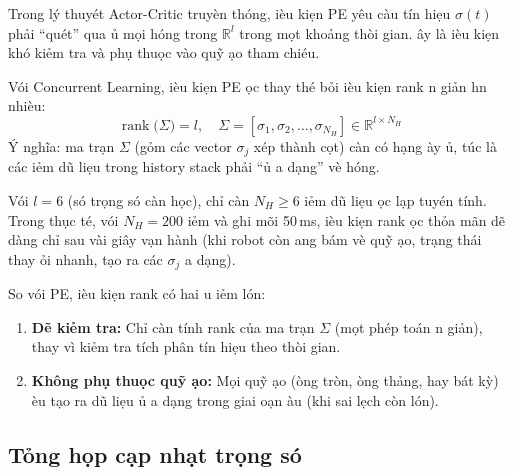\documentclass[12pt,a4paper]{article}
\newcommand{\R}{\mathbb{R}}
\DeclareMathOperator{\rank}{rank}
\begin{document}
Trong l\'{y} thuy\'{e}t Actor-Critic truy\`{e}n th\'{o}ng, \dj i\`{e}u ki\d{e}n PE y\^{e}u c\`{a}u t\'{i}n hi\d{e}u $\sigma(t)$ ph\h{a}i ``qu\'{e}t'' qua \dj\h{u} m\d{o}i h\uhorn{}\'{o}ng trong $\R^l$ trong m\d{o}t kho\h{a}ng th\`{o}i gian. \DJ\^{a}y l\`{a} \dj i\`{e}u ki\d{e}n kh\'{o} ki\h{e}m tra v\`{a} ph\d{u} thu\d{o}c v\`{a}o qu\~{y} \dj\d{a}o tham chi\'{e}u.

V\'{o}i Concurrent Learning, \dj i\`{e}u ki\d{e}n PE \dj\uhorn{}\d{o}c thay th\'{e} b\h{o}i \dj i\`{e}u ki\d{e}n rank \dj\ohorn{}n gi\h{a}n h\ohorn{}n nhi\`{e}u:
\begin{equation}\label{eq:rank_cond}
    \rank\big(\Sigma\big) = l, \quad \Sigma = [\sigma_1, \sigma_2, \ldots, \sigma_{N_H}] \in \R^{l \times N_H}
\end{equation}
\'{Y} ngh\~{i}a: ma tr\d{a}n $\Sigma$ (g\h{o}m c\'{a}c vector $\sigma_j$ x\'{e}p th\`{a}nh c\d{o}t) c\`{a}n c\'{o} h\d{a}ng \dj\`{a}y \dj\h{u}, t\'{u}c l\`{a} c\'{a}c \dj i\h{e}m d\~{u} li\d{e}u trong history stack ph\h{a}i ``\dj\h{u} \dj a d\d{a}ng'' v\`{e} h\uhorn{}\'{o}ng.

V\'{o}i $l = 6$ (s\'{o} tr\d{o}ng s\'{o} c\`{a}n h\d{o}c), ch\h{i} c\`{a}n $N_H \geq 6$ \dj i\h{e}m d\~{u} li\d{e}u \dj\d{o}c l\d{a}p tuy\'{e}n t\'{i}nh. Trong th\d{u}c t\'{e}, v\'{o}i $N_H = 200$ \dj i\h{e}m v\`{a} ghi m\~{o}i 50\,ms, \dj i\`{e}u ki\d{e}n rank \dj\uhorn{}\d{o}c th\h{o}a m\~{a}n d\~{e} d\`{a}ng ch\h{i} sau v\`{a}i gi\^{a}y v\d{a}n h\`{a}nh (khi robot c\`{o}n \dj ang b\'{a}m v\`{e} qu\~{y} \dj\d{a}o, tr\d{a}ng th\'{a}i thay \dj\h{o}i nhanh, t\d{a}o ra c\'{a}c $\sigma_j$ \dj a d\d{a}ng).

So v\'{o}i PE, \dj i\`{e}u ki\d{e}n rank c\'{o} hai \uhorn{}u \dj i\h{e}m l\'{o}n:
\begin{enumerate}[nosep]
    \item \textbf{D\~{e} ki\h{e}m tra:} Ch\h{i} c\`{a}n t\'{i}nh rank c\h{u}a ma tr\d{a}n $\Sigma$ (m\d{o}t ph\'{e}p to\'{a}n \dj\ohorn{}n gi\h{a}n), thay v\`{i} ki\h{e}m tra t\'{i}ch ph\^{a}n t\'{i}n hi\d{e}u theo th\`{o}i gian.
    \item \textbf{Kh\^{o}ng ph\d{u} thu\d{o}c qu\~{y} \dj\d{a}o:} M\d{o}i qu\~{y} \dj\d{a}o (\dj\uhorn{}\`{o}ng tr\`{o}n, \dj\uhorn{}\`{o}ng th\h{a}ng, hay b\'{a}t k\`{y}) \dj\`{e}u t\d{a}o ra d\~{u} li\d{e}u \dj\h{u} \dj a d\d{a}ng trong giai \dj o\d{a}n \dj\`{a}u (khi sai l\d{e}ch c\`{o}n l\'{o}n).
\end{enumerate}

\subsection{T\h{o}ng h\d{o}p c\d{a}p nh\d{a}t tr\d{o}ng s\'{o}}
\end{document}
